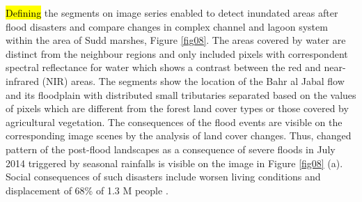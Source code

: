 \documentclass[analytics,article,submit,pdftex,moreauthors]{Definitions/mdpi}
\begin{document}
\hl{Defining} the segments on image series enabled to detect inundated areas after flood disasters and compare changes in complex channel and lagoon system within the area of Sudd marshes, Figure \ref{fig08}. The areas covered by water are distinct from the neighbour regions and only included pixels with correspondent spectral reflectance for water which shows a contrast between the red and near-infrared (NIR) areas. The segments show the location of the Bahr al Jabal flow and its floodplain with distributed small tributaries separated based on the values of pixels which are different from the forest land cover types or those covered by agricultural vegetation. The consequences of the flood events are visible on the corresponding image scenes by the analysis of land cover changes. Thus, changed pattern of the post-flood landscapes as a consequence of severe floods in July 2014 triggered by seasonal rainfalls is visible on the image in Figure \ref{fig08} (a). Social consequences of such disasters include worsen living conditions and displacement of 68\% of 1.3 M people \cite{ReliefWeb2014}.  
\end{document}
